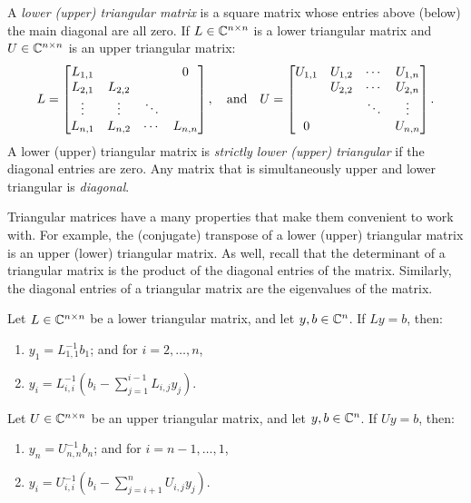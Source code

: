 \begin{definition}
A {\em lower (upper) triangular matrix} is a square matrix whose entries above (below) the main diagonal are all zero. If $L\in\mathbb{C}^{n\times n}$ is a lower triangular matrix and $U\in\mathbb{C}^{n\times n}$ is an upper triangular matrix:
\[
L = \begin{bmatrix}
L_{1,1} & & & 0\\
L_{2,1} & L_{2,2}\\
\vdots & \vdots & \ddots\\
L_{n,1} & L_{n,2} & \cdots & L_{n,n}\\
\end{bmatrix},
\quad{\rm and}\quad
U = \begin{bmatrix}
U_{1,1} & U_{1,2} & \cdots & U_{1,n}\\
& U_{2,2} & \cdots & U_{2,n}\\
& & \ddots & \vdots\\
0 & & & U_{n,n}\\
\end{bmatrix}.
\]
A lower (upper) triangular matrix is {\em strictly lower (upper) triangular} if the diagonal entries are zero. Any matrix that is simultaneously upper and lower triangular is {\em diagonal}.
\end{definition}

Triangular matrices have a many properties that make them convenient to work with. For example, the (conjugate) transpose of a lower (upper) triangular matrix is an upper (lower) triangular matrix. As well, recall that the determinant of a triangular matrix is the product of the diagonal entries of the matrix. Similarly, the diagonal entries of a triangular matrix are the eigenvalues of the matrix.

\begin{algorithm}
Let $L\in\mathbb{C}^{n\times n}$ be a lower triangular matrix, and let $y,b\in\mathbb{C}^n$. If $Ly = b$, then:
\begin{enumerate}
\item $y_1 = L_{1,1}^{-1}b_1$; and for $i=2,\ldots,n$,
\item $\displaystyle y_i = L_{i,i}^{-1}\left(b_i - \sum_{j=1}^{i-1}L_{i,j}y_j\right)$.
\end{enumerate}
\end{algorithm}

\begin{algorithm}
Let $U\in\mathbb{C}^{n\times n}$ be an upper triangular matrix, and let $y,b\in\mathbb{C}^n$. If $Uy = b$, then:
\begin{enumerate}
\item $y_n = U_{n,n}^{-1}b_n$; and for $i=n-1,\ldots,1$,
\item $\displaystyle y_i = U_{i,i}^{-1}\left(b_i - \sum_{j=i+1}^nU_{i,j}y_j\right)$.
\end{enumerate}
\end{algorithm}

